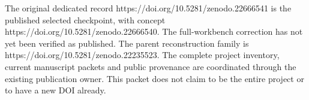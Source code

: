 The original dedicated record https://doi.org/10.5281/zenodo.22666541 is
the published selected checkpoint, with concept
https://doi.org/10.5281/zenodo.22666540. The full-workbench correction
has not yet been verified as published. The parent reconstruction family
is https://doi.org/10.5281/zenodo.22235523. The complete project
inventory, current manuscript packets and public provenance are
coordinated through the existing publication owner. This packet does not
claim to be the entire project or to have a new DOI already.
